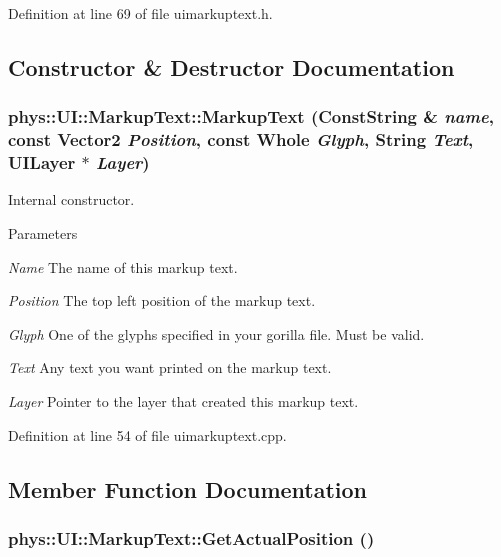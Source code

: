 Definition at line 69 of file uimarkuptext.h.



\subsection{Constructor \& Destructor Documentation}
\hypertarget{classphys_1_1UI_1_1MarkupText_adc462bb1d0f8220ab309ef0844b6ebd5}{
\subsubsection[{MarkupText}]{\setlength{\rightskip}{0pt plus 5cm}phys::UI::MarkupText::MarkupText ({\bf ConstString} \& {\em name}, \/  const {\bf Vector2} {\em Position}, \/  const {\bf Whole} {\em Glyph}, \/  {\bf String} {\em Text}, \/  {\bf UILayer} $\ast$ {\em Layer})}}
\label{d7/d23/classphys_1_1UI_1_1MarkupText_adc462bb1d0f8220ab309ef0844b6ebd5}


Internal constructor. 


\begin{DoxyParams}{Parameters}
\item[{\em Name}]The name of this markup text. \item[{\em Position}]The top left position of the markup text. \item[{\em Glyph}]One of the glyphs specified in your gorilla file. Must be valid. \item[{\em Text}]Any text you want printed on the markup text. \item[{\em Layer}]Pointer to the layer that created this markup text. \end{DoxyParams}


Definition at line 54 of file uimarkuptext.cpp.



\subsection{Member Function Documentation}
\hypertarget{classphys_1_1UI_1_1MarkupText_a1e5bfba8d1686cb4188793fd695c7090}{
\subsubsection[{GetActualPosition}]{ phys::UI::MarkupText::GetActualPosition ()}}
\label{d7/d23/classphys_1_1UI_1_1MarkupText_a1e5bfba8d1686cb4188793fd695c7090}


